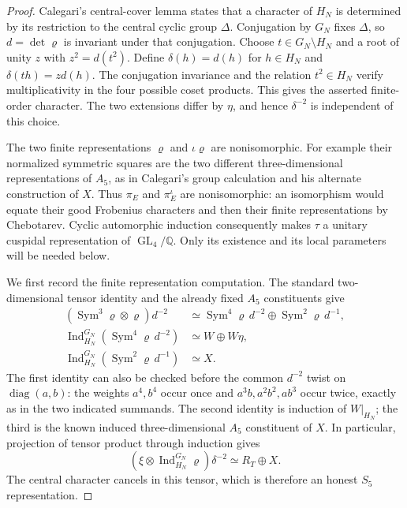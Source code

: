 \begin{proof}
Calegari's central-cover lemma states that a character of
\(H_N\) is determined by its restriction to the central
cyclic group \(\Delta\). Conjugation by \(G_N\) fixes
\(\Delta\), so \(d=\det\varrho\) is invariant under
that conjugation. Choose \(t\in G_N\setminus H_N\) and
a root of unity \(z\) with \(z^2=d(t^2)\). Define
\(\delta(h)=d(h)\) for \(h\in H_N\) and
\(\delta(th)=z d(h)\). The conjugation invariance and
the relation \(t^2\in H_N\) verify multiplicativity in
the four possible coset products. This gives the asserted
finite-order character. The two extensions differ by
\(\eta\), and hence \(\delta^{-2}\) is independent of
this choice.

The two finite representations \(\varrho\) and
\(\iota\varrho\) are nonisomorphic. For example their
normalized symmetric squares are the two different
three-dimensional representations of \(A_5\), as in
Calegari's group calculation and his alternate construction
of \(X\). Thus \(\pi_E\) and \(\pi_E^\iota\) are
nonisomorphic: an isomorphism would equate their good
Frobenius characters and then their finite representations
by Chebotarev. Cyclic automorphic induction consequently
makes \(\tau\) a unitary cuspidal representation of
\(\operatorname{GL}_4/\mathbb Q\). Only its existence
and its local parameters will be needed below.

We first record the finite representation computation.
The standard two-dimensional tensor identity and the
already fixed \(A_5\) constituents give
\[
 \begin{aligned}
 (\operatorname{Sym}^3\varrho\otimes\varrho)d^{-2}
   &\simeq
       \operatorname{Sym}^4\varrho\,d^{-2}
          \oplus\operatorname{Sym}^2\varrho\,d^{-1},\\
 \operatorname{Ind}_{H_N}^{G_N}
       (\operatorname{Sym}^4\varrho\,d^{-2})
   &\simeq W\oplus W\eta,\\
 \operatorname{Ind}_{H_N}^{G_N}
       (\operatorname{Sym}^2\varrho\,d^{-1})
   &\simeq X.
 \end{aligned}
 \tag{MA-RB.315}
\]
The first identity can also be checked before the common
\(d^{-2}\) twist on \(\operatorname{diag}(a,b)\): the weights
\(a^4,b^4\) occur once and \(a^3b,a^2b^2,ab^3\)
occur twice, exactly as in the two indicated summands.
The second identity is induction of \(W|_{H_N}\);
the third is the known induced three-dimensional
\(A_5\) constituent of \(X\). In particular, projection
of tensor product through induction gives
\[
 (\xi\otimes\operatorname{Ind}_{H_N}^{G_N}\varrho)
                    \delta^{-2}\simeq R_T\oplus X.
 \tag{MA-RB.316}
\]
The central character cancels in this tensor, which is
therefore an honest \(S_5\) representation.


\end{proof}
